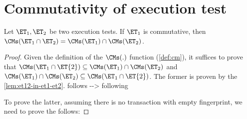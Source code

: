 \section{Commutativity of execution test}

\begin{theorem}
\label{thm:appendix-et-composition-1}
Let $\ET_1, \ET_2$ be two execution tests. If $\ET_1$ is commutative, 
then $\CMs(\ET_1 \cap \ET_2) = \CMs(\ET_1) \cap \CMs(\ET_2)$. 
\end{theorem}
\begin{proof}
Given the definition of the \( \CMs(.) \) function (\cref{def:cm}), it suffices to prove that \( \CMs(\ET_{1} \cap \ET{2}) \subseteq \CMs(\ET_1) \cap \CMs(\ET_2) \) and \( \CMs(\ET_1) \cap \CMs(\ET_2) \subseteq \CMs(\ET_{1} \cap \ET{2}) \).
The former is proven by the \cref{lem:et12-in-et1-et2}.
\ac{follows --> following}

To prove the latter, assuming there is no transaction with empty fingerprint, we need to prove the follows:


\end{proof}

